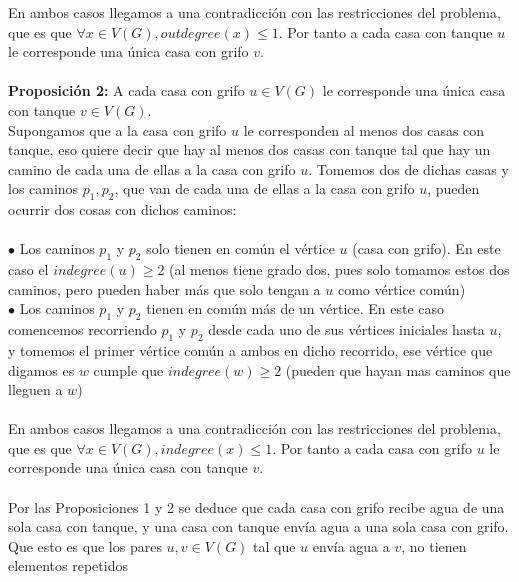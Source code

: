 \documentclass{article}
\begin{document}
    En ambos casos llegamos a una contradicci\'on con las restricciones del problema, que es que $\forall x \in V(G), outdegree(x) \leq 1$. 
    Por tanto a cada casa con tanque $u$ le corresponde una \'unica casa con grifo $v$.\\\\

    \noindent \textbf{Proposici\'on 2:} A cada casa con grifo $u \in V(G)$ le corresponde una \'unica casa con tanque $v \in V(G)$.\\

    Supongamos que a la casa con grifo $u$ le corresponden al menos dos casas con tanque, eso quiere decir que hay al menos dos casas
    con tanque tal que hay un camino de cada una de ellas a la casa con grifo $u$. Tomemos dos de dichas casas y los caminos $p_1, p_2$,
     que van de cada una de ellas a la casa con grifo $u$, pueden ocurrir dos cosas con dichos caminos:\\\\

    $\bullet$ Los caminos $p_1$ y $p_2$ solo tienen en com\'un el v\'ertice $u$ (casa con grifo). En este caso
    el $indegree(u) \geq 2$ (al menos tiene grado dos, pues solo tomamos estos dos caminos, pero pueden haber m\'as que
    solo tengan a $u$ como v\'ertice com\'un)\\
 
    $\bullet$ Los caminos $p_1$ y $p_2$ tienen en com\'un m\'as de un v\'ertice. En este caso comencemos recorriendo $p_1$ y $p_2$ desde cada
    uno de sus v\'ertices iniciales hasta $u$, y tomemos el primer v\'ertice com\'un a ambos en dicho recorrido, ese v\'ertice que digamos es $w$
    cumple que $indegree(w) \geq 2$ (pueden que hayan mas caminos que lleguen a $w$)\\\\

    En ambos casos llegamos a una contradicci\'on con las restricciones del problema, que es que $\forall x \in V(G), indegree(x) \leq 1$. 
    Por tanto a cada casa con grifo $u$ le corresponde una \'unica casa con tanque $v$.\\\\

    Por las Proposiciones 1 y 2 se deduce que cada casa con grifo recibe agua de una sola casa con tanque, y una casa con tanque env\'ia agua a
    una sola casa con grifo. Que esto es que los pares $u,v \in V(G)$ tal que $u$ env\'ia agua a $v$, no tienen elementos repetidos\\\\\
\end{document}
